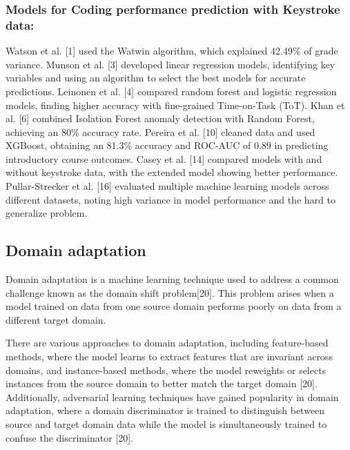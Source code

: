 \documentclass[sigconf,final]{acmart}
\begin{document}
\subsubsection{ Models for Coding performance prediction with Keystroke data:}


Watson et al. [1] used the Watwin algorithm, which explained 42.49\% of grade variance. Munson et al. [3] developed linear regression models, identifying key variables and using an algorithm to select the best models for accurate predictions. Leinonen et al. [4] compared random forest and logistic regression models, finding higher accuracy with fine-grained Time-on-Task (ToT). Khan et al. [6] combined Isolation Forest anomaly detection with Random Forest, achieving an 80\% accuracy rate. Pereira et al. [10] cleaned data and used XGBoost, obtaining an 81.3\% accuracy and ROC-AUC of 0.89 in predicting introductory course outcomes. Casey et al. [14] compared models with and without keystroke data, with the extended model showing better performance. Pullar-Strecker et al. [16] evaluated multiple machine learning models across different datasets, noting high variance in model performance and the hard to generalize problem.


\subsection{Domain adaptation}
Domain adaptation is a machine learning technique used to address a common challenge known as the domain shift problem[20]. This problem arises when a model trained on data from one source domain performs poorly on data from a different target domain.


There are various approaches to domain adaptation, including feature-based methods, where the model learns to extract features that are invariant across domains, and instance-based methods, where the model reweights or selects instances from the source domain to better match the target domain [20]. Additionally, adversarial learning techniques have gained popularity in domain adaptation, where a domain discriminator is trained to distinguish between source and target domain data while the model is simultaneously trained to confuse the discriminator [20].
\end{document}
